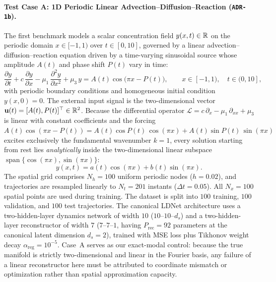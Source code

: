 \paragraph{Test Case A: 1D Periodic Linear Advection--Diffusion--Reaction (\texttt{ADR-1b}).}
The first benchmark models a scalar concentration field $y(x,t) \in \mathbb{R}$ on the periodic domain $x \in [-1, 1)$ over $t \in [0, 10]$, governed by a linear advection--diffusion--reaction equation driven by a time-varying sinusoidal source whose amplitude $A(t)$ and phase shift $P(t)$ vary in time:
\begin{equation}
  \frac{\partial y}{\partial t} + c\,\frac{\partial y}{\partial x} - \mu_1\,\frac{\partial^2 y}{\partial x^2} + \mu_3\,y = A(t)\cos\!\big(\pi x - P(t)\big), \qquad x \in [-1, 1), \quad t \in (0, 10],
  \label{eq:caseA_pde}
\end{equation}
with periodic boundary conditions and homogeneous initial condition $y(x,0) = 0$. The external input signal is the two-dimensional vector $\mathbf{u}(t) = [A(t), P(t)]^\top \in \mathbb{R}^2$. Because the differential operator $\mathcal{L} = c\,\partial_x - \mu_1\,\partial_{xx} + \mu_3$ is linear with constant coefficients and the forcing $A(t)\cos(\pi x - P(t)) = A(t)\cos P(t)\,\cos(\pi x) + A(t)\sin P(t)\,\sin(\pi x)$ excites exclusively the fundamental wavenumber $k = 1$, every solution starting from rest lies \emph{analytically} inside the two-dimensional linear subspace $\operatorname{span}\{\cos(\pi x), \sin(\pi x)\}$:
\begin{equation}
  y(x,t) = a(t)\cos(\pi x) + b(t)\sin(\pi x).
  \label{eq:caseA_exact_span}
\end{equation}
The spatial grid comprises $N_h = 100$ uniform periodic nodes ($h = 0.02$), and trajectories are resampled linearly to $N_t = 201$ instants ($\Delta t = 0.05$). All $N_x = 100$ spatial points are used during training. The dataset is split into $100$ training, $100$ validation, and $100$ test trajectories. The canonical LDNet architecture uses a two-hidden-layer dynamics network of width $10$ ($10\text{--}10\text{--}d_s$) and a two-hidden-layer reconstructor of width $7$ ($7\text{--}7\text{--}1$, having $P_{\mathrm{rec}} = 92$ parameters at the canonical latent dimension $d_s = 2$), trained with MSE loss plus Tikhonov weight decay $\alpha_{\mathrm{reg}} = 10^{-5}$. Case~A serves as our exact-modal control: because the true manifold is strictly two-dimensional and linear in the Fourier basis, any failure of a linear reconstructor here must be attributed to coordinate mismatch or optimization rather than spatial approximation capacity.

